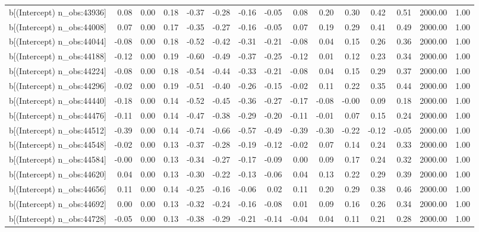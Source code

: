 \begin{table}[ht]
\begin{tabular}{rrrrrrrrrrrrrrr}
  b[(Intercept) n\_obs:43936] & 0.08 & 0.00 & 0.18 & -0.37 & -0.28 & -0.16 & -0.05 & 0.08 & 0.20 & 0.30 & 0.42 & 0.51 & 2000.00 & 1.00 \\ 
  b[(Intercept) n\_obs:44008] & 0.07 & 0.00 & 0.17 & -0.35 & -0.27 & -0.16 & -0.05 & 0.07 & 0.19 & 0.29 & 0.41 & 0.49 & 2000.00 & 1.00 \\ 
  b[(Intercept) n\_obs:44044] & -0.08 & 0.00 & 0.18 & -0.52 & -0.42 & -0.31 & -0.21 & -0.08 & 0.04 & 0.15 & 0.26 & 0.36 & 2000.00 & 1.00 \\ 
  b[(Intercept) n\_obs:44188] & -0.12 & 0.00 & 0.19 & -0.60 & -0.49 & -0.37 & -0.25 & -0.12 & 0.01 & 0.12 & 0.23 & 0.34 & 2000.00 & 1.00 \\ 
  b[(Intercept) n\_obs:44224] & -0.08 & 0.00 & 0.18 & -0.54 & -0.44 & -0.33 & -0.21 & -0.08 & 0.04 & 0.15 & 0.29 & 0.37 & 2000.00 & 1.00 \\ 
  b[(Intercept) n\_obs:44296] & -0.02 & 0.00 & 0.19 & -0.51 & -0.40 & -0.26 & -0.15 & -0.02 & 0.11 & 0.22 & 0.35 & 0.44 & 2000.00 & 1.00 \\ 
  b[(Intercept) n\_obs:44440] & -0.18 & 0.00 & 0.14 & -0.52 & -0.45 & -0.36 & -0.27 & -0.17 & -0.08 & -0.00 & 0.09 & 0.18 & 2000.00 & 1.00 \\ 
  b[(Intercept) n\_obs:44476] & -0.11 & 0.00 & 0.14 & -0.47 & -0.38 & -0.29 & -0.20 & -0.11 & -0.01 & 0.07 & 0.15 & 0.24 & 2000.00 & 1.00 \\ 
  b[(Intercept) n\_obs:44512] & -0.39 & 0.00 & 0.14 & -0.74 & -0.66 & -0.57 & -0.49 & -0.39 & -0.30 & -0.22 & -0.12 & -0.05 & 2000.00 & 1.00 \\ 
  b[(Intercept) n\_obs:44548] & -0.02 & 0.00 & 0.13 & -0.37 & -0.28 & -0.19 & -0.12 & -0.02 & 0.07 & 0.14 & 0.24 & 0.33 & 2000.00 & 1.00 \\ 
  b[(Intercept) n\_obs:44584] & -0.00 & 0.00 & 0.13 & -0.34 & -0.27 & -0.17 & -0.09 & 0.00 & 0.09 & 0.17 & 0.24 & 0.32 & 2000.00 & 1.00 \\ 
  b[(Intercept) n\_obs:44620] & 0.04 & 0.00 & 0.13 & -0.30 & -0.22 & -0.13 & -0.06 & 0.04 & 0.13 & 0.22 & 0.29 & 0.39 & 2000.00 & 1.00 \\ 
  b[(Intercept) n\_obs:44656] & 0.11 & 0.00 & 0.14 & -0.25 & -0.16 & -0.06 & 0.02 & 0.11 & 0.20 & 0.29 & 0.38 & 0.46 & 2000.00 & 1.00 \\ 
  b[(Intercept) n\_obs:44692] & 0.00 & 0.00 & 0.13 & -0.32 & -0.24 & -0.16 & -0.08 & 0.01 & 0.09 & 0.16 & 0.26 & 0.34 & 2000.00 & 1.00 \\ 
  b[(Intercept) n\_obs:44728] & -0.05 & 0.00 & 0.13 & -0.38 & -0.29 & -0.21 & -0.14 & -0.04 & 0.04 & 0.11 & 0.21 & 0.28 & 2000.00 & 1.00 \\ 

\end{tabular}
\end{table}
